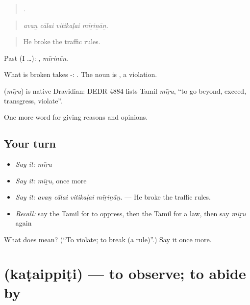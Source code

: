 \begin{quote}
   .
\end{quote}

\begin{quote}
\emph{avaṉ cālai vitikaḷai mīṟiṉāṉ.}
\end{quote}

\begin{quote}
He broke the traffic rules.
\end{quote}

Past (I …): , \emph{mīṟiṉēṉ}.

What is broken takes -:  . The noun is , a violation.

\begin{cousinweb}
\textbf{} (\emph{mīṟu}) is native Dravidian: DEDR 4884 lists Tamil \emph{mīṟu}, \textquotedblleft{}to go beyond, exceed, transgress, violate\textquotedblright{}.
\end{cousinweb}

\begin{grammarlens}[title={What you've built}]
One more word for giving reasons and opinions.
\end{grammarlens}

\subsection*{Your turn}
\begin{itemize}
\raggedright
  \item \emph{Say it:} \emph{mīṟu}
  \item \emph{Say it:} \emph{mīṟu}, once more
  \item \emph{Say it:} \emph{avaṉ cālai vitikaḷai mīṟiṉāṉ.} — He broke the traffic rules.
  \item \emph{Recall:} say the Tamil for to oppress, then the Tamil for a law, then say \emph{mīṟu} again
\end{itemize}

\begin{tcolorbox}[breakable,colback=teal!4,colframe=teal!35!black,title={Before you move on}]
What does  mean? (\textquotedblleft{}To violate; to break (a rule)\textquotedblright{}.) Say it once more.
\end{tcolorbox}
\section[\texorpdfstring{\ta{கடைப்பிடி} (kaṭaippiṭi)}{கடைப்பிடி (kaṭaippiṭi)}]{ (kaṭaippiṭi) — to observe; to abide by}

